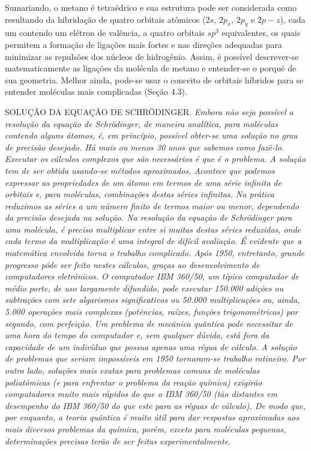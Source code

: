 Sumariando, o metano é tetraédrico e sua estrutura pode ser considerada como resultando da hibridação de quatro orbitais atômicos ($2s$, $2p_x$, $2p_y$ e $2p-z$), cada um contendo um elétron de valência, a quatro orbitais $sp^3$ equivalentes, os quais permitem a formação de ligações mais fortes e nas direções adequadas para minimizar as repulsões dos núcleos de hidrogênio. Assim, é possível descrever-se matematicamente as ligações da molécula de metano e entender-se o porquê de sua geometria. Melhor ainda, pode-se usar o conceito de orbitais híbridos para se entender moléculas mais complicadas (Seção 4.3). 

\par\bigskip
\noindent SOLUÇÃO DA EQUAÇÃO DE SCHRÖDINGER. \emph{Embora não seja possível a resolução da equação de Schrödinger, de maneira analítica, para moléculas contendo alguns átomos, é, em princípio, possível obter-se uma solução no grau de precisão desejado. Há mais ou menos 30 anos que sabemos como fazê-lo. Executar os cálculos complexos que são necessários é que é o problema. A solução tem de ser obtida usando-se métodos aproximados. Acontece que podemos expressar as propriedades de um átomo em termos de uma série infinita de orbitais e, para moléculas, combinações destas séries infinitas. Na prática reduzimos as séries a um número finito de termos maior ou menor, dependendo da precisão desejada na solução. Na resolução da equação de Schrödinger para uma molécula, é preciso multiplicar entre si muitas destas séries reduzidas, onde cada termo da multiplicação é uma integral de difícil avaliação. É evidente que a matemática envolvida torna o trabalho complicado. Após 1950, entretanto, grande progresso pôde ser feito nestes cálculos, graças ao desenvolvimento de computadores eletrônicos. O computador IBM 360/50, um típico computador de médio porte, de uso largamente difundido, pode executar 150.000 adições ou subtrações com sete algarismos significativos ou 50.000 multiplicações ou, ainda, 5.000 operações mais complexas (potências, raízes, funções trigonométricas) por segundo, com perfeição. Um problema de mecânica quântica pode necessitar de uma hora do tempo do computador e, sem qualquer dúvida, está fora da capacidade de um indivíduo que possua apenas uma régua de cálculo. A solução de problemas que seriam impossíveis em 1950 tornaram-se trabalho rotineiro. Por outro lado, soluções mais exatas para problemas comuns de moléculas poliatômicas (e para enfrentar o problema da reação química) exigirão computadores muito mais rápidos do que o IBM 360/50 (tão distantes em desempenho do IBM 360/50 do que este para as réguas de cálculo). De modo que, por enquanto, a teoria quântica é muito útil para dar respostas aproximadas aos mais diversos problemas da química, porém, exceto para moléculas pequenas, determinações precisas terão de ser feitas experimentalmente.}